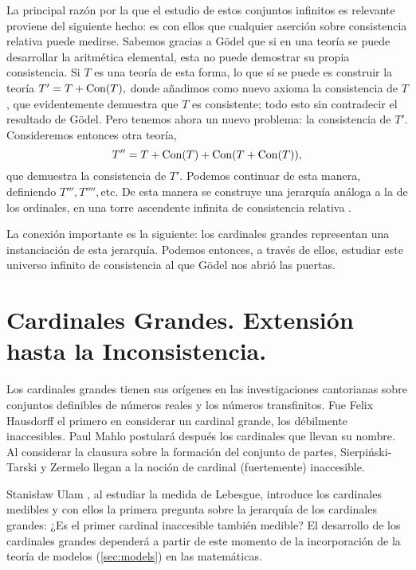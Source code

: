 La principal razón por la que el estudio de estos conjuntos infinitos
es relevante proviene del siguiente hecho:
es con ellos que cualquier aserción sobre consistencia relativa
puede medirse.
Sabemos gracias a Gödel que si en una teoría se puede desarrollar la aritmética
elemental, esta no puede demostrar su propia consistencia.
Si $T$ es una teoría de esta forma, lo que sí se puede es construir la teoría
$T'=T+\operatorname{Con} ( T ),$
donde añadimos como nuevo axioma la consistencia
de $T$,
que evidentemente demuestra que $T$ es consistente; todo esto sin contradecir
el resultado de Gödel. Pero tenemos ahora un nuevo problema: la consistencia
de $T'$.
Consideremos entonces otra teoría,
\[T'' = T + \operatorname{Con} ( T ) + \operatorname{Con} ( T + \operatorname{Con} ( T ) ),\]
que demuestra la consistencia de $T'$.
Podemos continuar de esta manera, definiendo $T''', T'''',\text{etc}$.
De esta manera se construye una jerarquía análoga a la de los ordinales,
en una torre ascendente infinita de consistencia relativa
\autocite[\S 7.7]{hamkins_lectures_2020}.

La conexión importante es la siguiente:
los cardinales grandes representan una instanciación de esta jerarquía.
Podemos entonces, a través de ellos, estudiar este universo infinito de
consistencia al que Gödel nos abrió las puertas.

\section*{Cardinales Grandes. Extensión hasta la Inconsistencia.}

Los cardinales grandes tienen sus orígenes en las investigaciones cantorianas
sobre conjuntos definibles de números reales y los números transfinitos.
Fue Felix Hausdorff \autocite{hausdorff_grundzuge_nodate}
el primero en considerar un cardinal grande,
los débilmente inaccesibles.
Paul Mahlo \autocite{mahlo_uber_1911,mahlo_zur_1912,mahlo_zur_1913}
postulará después los cardinales que llevan su nombre.
Al considerar la clausura sobre la formación del conjunto de partes,
Sierpiński-Tarski \autocite{sierpinski_sur_1930} y  Zermelo \autocite{zermelo_uber_1930}
llegan a la noción de cardinal (fuertemente) inaccesible.

Stanisław Ulam \autocite{ulam_zur_1930}, al estudiar la medida de Lebesgue,
introduce los cardinales medibles y con ellos la primera
pregunta sobre la jerarquía de los cardinales grandes:
¿Es el primer cardinal inaccesible también medible?
El desarrollo de los cardinales grandes dependerá a partir de este
momento de la incorporación de la teoría de modelos (\ref{sec:models}) en las matemáticas.

